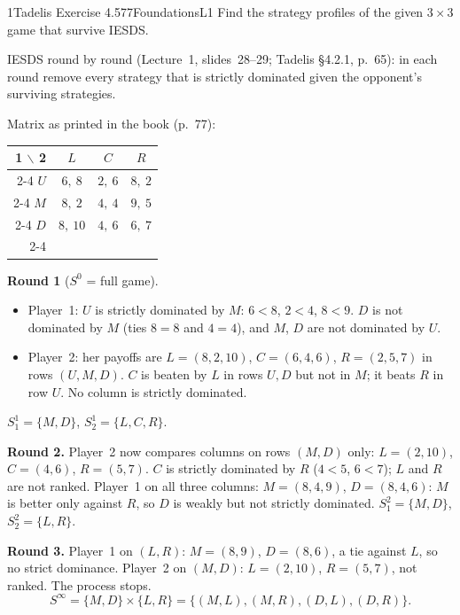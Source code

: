 \begin{exsol}{1}{Tadelis Exercise 4.5}{77}{Foundations}{L1}
\asked Find the strategy profiles of the given $3 \times 3$ game that survive IESDS.

\method IESDS round by round (Lecture~1, slides~28--29; Tadelis \S4.2.1, p.~65): in each round
remove every strategy that is strictly dominated given the opponent's surviving strategies.

\solution
Matrix as printed in the book (p.~77):
\begin{center}
\begin{tabular}{r|c|c|c|}
\multicolumn{1}{r}{1 $\backslash$ 2} & \multicolumn{1}{c}{$L$} & \multicolumn{1}{c}{$C$} & \multicolumn{1}{c}{$R$}\\ \cline{2-4}
$U$ & $6,\ 8$ & $2,\ 6$ & $8,\ 2$ \\ \cline{2-4}
$M$ & $8,\ 2$ & $4,\ 4$ & $9,\ 5$ \\ \cline{2-4}
$D$ & $8,\ 10$ & $4,\ 6$ & $6,\ 7$ \\ \cline{2-4}
\end{tabular}
\end{center}

\textbf{Round 1} ($S^0$ = full game).
\begin{itemize}
  \item Player~1: $U$ is strictly dominated by $M$: $6 < 8$, $2 < 4$, $8 < 9$. $D$ is not
  dominated by $M$ (ties $8 = 8$ and $4 = 4$), and $M$, $D$ are not dominated by $U$.
  \item Player~2: her payoffs are $L = (8, 2, 10)$, $C = (6, 4, 6)$, $R = (2, 5, 7)$ in rows
  $(U, M, D)$. $C$ is beaten by $L$ in rows $U, D$ but not in $M$; it beats $R$ in row $U$. No
  column is strictly dominated.
\end{itemize}
$S_1^1 = \{M, D\}$, $S_2^1 = \{L, C, R\}$.

\textbf{Round 2.} Player~2 now compares columns on rows $(M, D)$ only:
$L = (2, 10)$, $C = (4, 6)$, $R = (5, 7)$. $C$ is strictly dominated by $R$ ($4 < 5$, $6 < 7$);
$L$ and $R$ are not ranked. Player~1 on all three columns: $M = (8, 4, 9)$, $D = (8, 4, 6)$:
$M$ is better only against $R$, so $D$ is weakly but not strictly dominated.
$S_1^2 = \{M, D\}$, $S_2^2 = \{L, R\}$.

\textbf{Round 3.} Player~1 on $(L, R)$: $M = (8, 9)$, $D = (8, 6)$, a tie against $L$, so no
strict dominance. Player~2 on $(M, D)$: $L = (2, 10)$, $R = (5, 7)$, not ranked. The process
stops.
\[
  S^\infty = \{M, D\} \times \{L, R\} = \{(M,L), (M,R), (D,L), (D,R)\}.
\]


\end{exsol}
